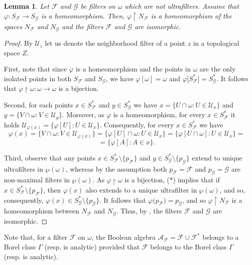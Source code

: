 \documentclass[a4paper,11pt,fleqn]{amsart}
\newtheorem{lemma}[theorem]{Lemma}
\theoremstyle{definition}
\theoremstyle{remark}
\numberwithin{equation}{section}
\newcommand{\N}{\mathbb{N}}
\newcommand{\aA}{\mathcal{A}}
\newcommand{\fF}{\mathcal{F}}
\newcommand{\gG}{\mathcal{G}}
\newcommand{\uU}{\mathcal{U}}
\newcommand{\rstr}{\restriction}
\newcommand{\sm}{\setminus}
\newcommand{\wo}{{\wp(\omega)}}%
\begin{document}
\begin{lemma}\label{lemma:sf_homeo_to_filt_iso}
Let $\fF$ and $\gG$ be filters on $\omega$ which are not ultrafilters. Assume that $\varphi\colon S_{\fF}\to S_{\gG}$ is a homeomorphism. Then, $\varphi\rstr N_{\fF}$ is a homeomorphism of the spaces $N_{\fF}$ and $N_{\gG}$ and the filters $\fF$ and $\gG$ are isomorphic.
\end{lemma}
\begin{proof}
By $\uU_z$ let us denote the neighborhood filter of a point $z$ in a topological space $Z$.

First, note that since $\varphi$ is a homeomorphism and the points in $\omega$ are the only isolated points in both $S_{\fF}$ and $S_{\gG}$, we have $\varphi[\omega]=\omega$ and $\varphi\big[S_\fF^*\big]=S_\gG^*$. It follows that $\varphi\rstr\omega\colon\omega\to\omega$ is a bijection.

Second, for each points $x\in S_{\fF}^*$ and $y\in S_{\gG}^*$ we have $x=\big\{U\cap\omega\colon U\in\uU_x\big\}$ and $y=\big\{V\cap\omega\colon V\in\uU_y\big\}$. Moreover, as $\varphi$ is a homeomorphism, for every $x\in S_{\fF}^*$ it holds $\uU_{\varphi(x)}=\big\{\varphi[U]\colon U\in\uU_x\big\}$. Consequently, for every $x\in S_{\fF}^*$ we have
\[\tag{$*$}\varphi(x)=\big\{V\cap\omega\colon V\in\uU_{\varphi(x)}\big\}=\big\{\varphi[U]\cap\omega\colon U\in\uU_x\big\}=\big\{\varphi[U\cap\omega]\colon U\in\uU_x\big\}=\]
\[=\{\varphi[A]\colon A\in x\}.\]

Third, observe that any points $x\in S_{\fF}^*\sm\big\{p_{\fF}\big\}$ and $y\in S_{\gG}^*\sm\big\{p_{\gG}\big\}$ extend to unique ultrafilters in $\wo$, whereas by the assumption both $p_{\fF}=\fF$ and $p_{\gG}=\gG$ are non-maximal filters in $\wo$. As $\varphi\rstr\omega$ is a bijection, ($*$) implies that if $x\in S_{\fF}^*\sm\big\{p_{\fF}\big\}$, then $\varphi(x)$ also extends to a unique ultrafilter in $\wo$, and so, consequently, $\varphi(x)\in S_{\gG}^*\sm\big\{p_\gG\big\}$. It follows that $\varphi\big(p_{\fF}\big)=p_{\gG}$, and so $\varphi\restriction N_{\fF}$ is a homeomorphism between $N_{\fF}$ and $N_{\gG}$. Thus, by \cite[Proposition 3.10.(2)]{MS24}, the filters $\fF$ and $\gG$ are isomorphic.
\end{proof}

Note that, for a filter $\fF$ on $\omega$, the Boolean algebra $\aA_\fF=\fF\cup\fF^*$ belongs to a Borel class $\Gamma$ (resp. is analytic) provided that $\fF$ belongs to the Borel class $\Gamma$ (resp. is analytic).
\end{document}
